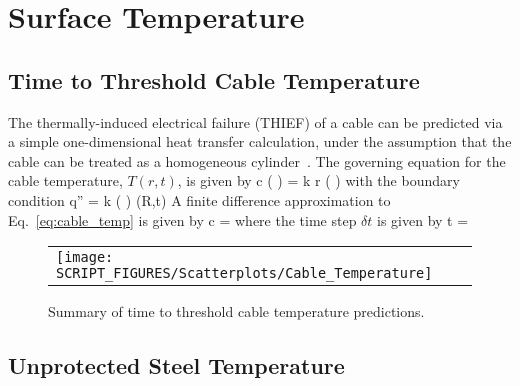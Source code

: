 
\chapter{Surface Temperature}
\label{Surface_Temperature_Chapter}

\clearpage

\section{Time to Threshold Cable Temperature}

The thermally-induced electrical failure (THIEF) of a cable can be predicted via a simple
one-dimensional heat transfer calculation, under the assumption that the cable can be
treated as a homogeneous cylinder~\cite{CAROLFIRE}. The governing equation for the cable temperature,
$T(r,t)$, is given by
\be
\rho c \left(  \right) =   k r \left(  \right)
\label{eq:cable_temp}
\ee
with the boundary condition
\be
\dot q'' = k \left(  \right) (R,t)
\ee
A finite difference approximation to Eq.~\ref{eq:cable_temp} is given by
\be
\rho c  =   
\ee
where the time step $\delta t$ is given by
\be
\delta t = 
\ee

\begin{figure}[!ht]
\begin{center}
\begin{tabular}{l}
\texttt{[image: SCRIPT\_FIGURES/Scatterplots/Cable\_Temperature]}
\end{tabular}
\end{center}
\caption[Summary of time to threshold cable temperature predictions]
{Summary of time to threshold cable temperature predictions.}
\label{Surface_Temperature_THIEF_Summary}
\end{figure}

\clearpage


\section{Unprotected Steel Temperature}

